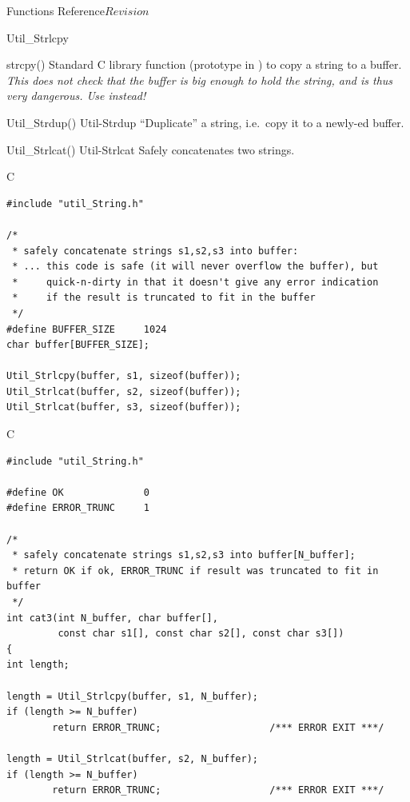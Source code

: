 \begin{cactuspart}{ Functions Reference}{}{$Revision$}
\begin{FunctionDescription}{Util\_Strlcpy}
\begin{SeeAlsoSection}
\begin{SeeAlso}{strcpy()}
Standard C library function (prototype in )
to copy a string to a buffer.
{\em This does not check that the buffer is big enough to hold the string,
and is thus very dangerous.  Use  instead!}
\end{SeeAlso}
\begin{SeeAlso2} {Util\_Strdup()} {Util-Strdup}
``Duplicate'' a string, i.e.\ copy it to a newly-ed buffer.
\end{SeeAlso2}
\begin{SeeAlso2} {Util\_Strlcat()} {Util-Strlcat}
Safely concatenates two strings.
\end{SeeAlso2}
\end{SeeAlsoSection}

\begin{ExampleSection}
\begin{Example}{C}
\begin{verbatim}
#include "util_String.h"

/*
 * safely concatenate strings s1,s2,s3 into buffer:
 * ... this code is safe (it will never overflow the buffer), but
 *     quick-n-dirty in that it doesn't give any error indication
 *     if the result is truncated to fit in the buffer
 */
#define BUFFER_SIZE     1024
char buffer[BUFFER_SIZE];

Util_Strlcpy(buffer, s1, sizeof(buffer));
Util_Strlcat(buffer, s2, sizeof(buffer));
Util_Strlcat(buffer, s3, sizeof(buffer));
\end{verbatim}
\end{Example}
\begin{Example}{C}
\begin{verbatim}
#include "util_String.h"

#define OK              0
#define ERROR_TRUNC     1

/*
 * safely concatenate strings s1,s2,s3 into buffer[N_buffer];
 * return OK if ok, ERROR_TRUNC if result was truncated to fit in buffer
 */
int cat3(int N_buffer, char buffer[],
         const char s1[], const char s2[], const char s3[])
{
int length;

length = Util_Strlcpy(buffer, s1, N_buffer);
if (length >= N_buffer)
        return ERROR_TRUNC;                   /*** ERROR EXIT ***/

length = Util_Strlcat(buffer, s2, N_buffer);
if (length >= N_buffer)
        return ERROR_TRUNC;                   /*** ERROR EXIT ***/


\end{verbatim}
\end{Example}
\end{ExampleSection}
\end{FunctionDescription}
\end{cactuspart}
